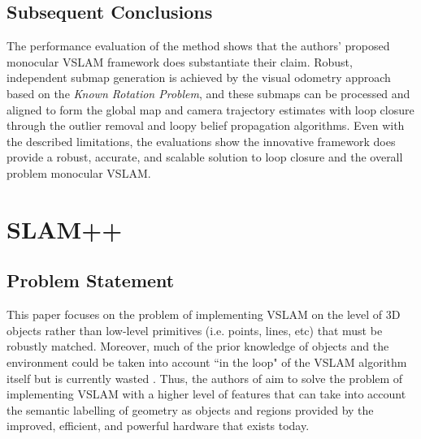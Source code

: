 \documentclass[10pt,twocolumn,letterpaper]{article}
\begin{document}
\subsection{Subsequent Conclusions}
The performance evaluation of the method shows that the authors' proposed monocular VSLAM framework does
 substantiate their claim. Robust, independent submap generation is achieved by the visual odometry approach 
based on the \textit{Known Rotation Problem}, and these submaps can be processed and aligned to form the 
global map and camera trajectory estimates with loop closure through the outlier removal and loopy belief 
propagation algorithms. Even with the described limitations, the evaluations show the innovative framework does 
provide a robust, accurate, and scalable solution to loop closure and the overall problem monocular VSLAM.

\section{SLAM++}
\subsection{Problem Statement}
This paper focuses on the problem of implementing VSLAM on the level of 3D objects rather than low-level 
primitives (i.e. points, lines, etc) that must be robustly matched. Moreover, much of the prior knowledge of
 objects and the environment could be taken into account ``in the loop" of the VSLAM algorithm itself but is 
 currently wasted \cite{Salas-Moreno_2013_CVPR}. Thus, the authors of \cite{Salas-Moreno_2013_CVPR} 
 aim to solve the problem of implementing VSLAM with a higher level of features that can take into account the semantic labelling of geometry as objects and regions provided by the improved, efficient, and powerful hardware that exists today.

\end{document}
